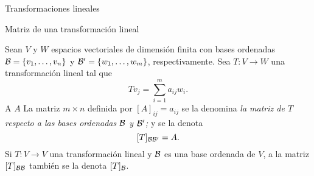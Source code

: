 \begin{chapter}{Transformaciones lineales}
\begin{section}{Matriz de una transformaci\'on lineal}
            \begin{definicion} Sean $V$ y $W$ espacios vectoriales de dimensión finita con bases ordenadas $\mathcal{B} = \{v_1,\ldots,v_n\}$  y $\mathcal{B}' = \{w_1,\ldots,w_m\}$, respectivamente. Sea $T: V \to W$ una transformación lineal tal que 
                \begin{equation*}\label{matriz-de-T-1}
                    Tv_j = \sum_{i=1}^{m} a_{ij} w_i.
                \end{equation*}
                A  $A$  La matriz $m \times n$  definida por $[A]_{ij} = a_{ij}$ se la  denomina \textit{la matriz de $T$ respecto a las bases ordenadas $\mathcal{B}$ y $\mathcal{B}'$;} y se la denota 
                $$
                [T]_{\mathcal{B} \mathcal{B}'} = A .
                $$
                Si $T: V \to V$ una transformación lineal y $\mathcal{B}$ es una base ordenada de $V$,  a la matriz $[T]_{\mathcal{B} \mathcal{B}}$ también se la denota $[T]_{\mathcal{B}}$.
            \end{definicion}
            

\end{section}
\end{chapter}
